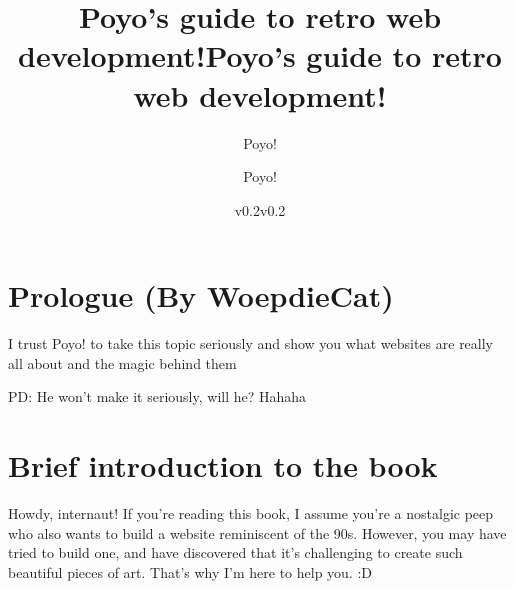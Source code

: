 \documentclass[
  paper=a4,
  ,captions=tableheading
]{scrbook}
\title{Poyo's guide to retro web development!}
\author{Poyo!}
\date{v0.2}
\title{Poyo's guide to retro web development!}
\author{Poyo!}
\date{v0.2}
\begin{document}
\begin{titlepage}
\newcommand{\colorRule}[3][black]{\textcolor[HTML]{#1}{\rule{#2}{#3}}}
\end{titlepage}
\restoregeometry
{}




{
\setcounter{tocdepth}{3}
\tableofcontents
\newpage
}
\hypertarget{prologue-by-woepdiecat}{%
\section{Prologue (By WoepdieCat)}\label{prologue-by-woepdiecat}}

I trust Poyo! to take this topic seriously and show you what websites
are really all about and the magic behind them

PD: He won't make it seriously, will he? Hahaha \newpage

\hypertarget{brief-introduction-to-the-book}{%
\section{Brief introduction to the
book}\label{brief-introduction-to-the-book}}

Howdy, internaut! If you're reading this book, I assume you're a
nostalgic peep who also wants to build a website reminiscent of the 90s.
However, you may have tried to build one, and have discovered that it's
challenging to create such beautiful pieces of art. That's why I'm here
to help you. :D
\end{document}
